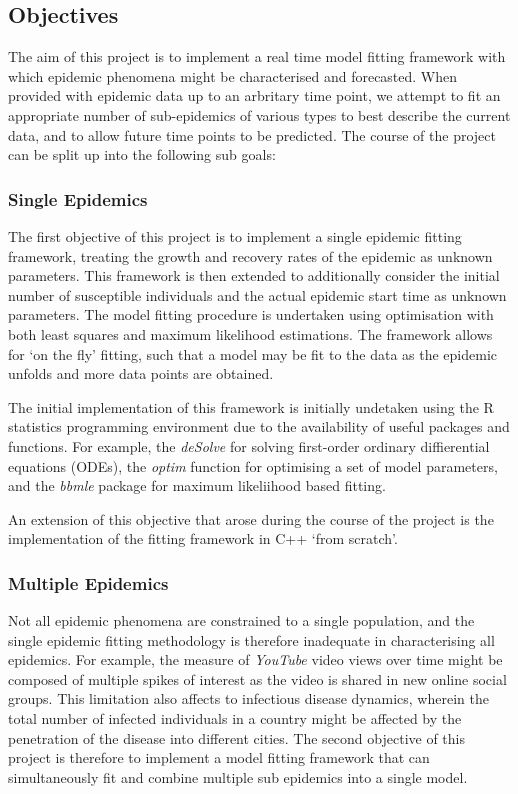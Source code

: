 \documentclass[11pt, a4paper, oneside,titlepage]{article}
\begin{document}
\subsection{Objectives}
The aim of this project is to implement a real time model fitting
framework with which epidemic phenomena might be characterised and
forecasted. When provided with epidemic data up to an arbritary time point,
we attempt to fit an appropriate number of sub-epidemics of various
types to best describe the current data, and to allow future time
points to be predicted. The course of the project can be split up into
the following sub goals:

\subsubsection{Single Epidemics}
The first objective of this project is to implement a single epidemic
fitting framework, treating the growth and recovery rates of the
epidemic as unknown parameters. This framework is then extended to
additionally consider the initial number of susceptible individuals
and the actual epidemic start time as unknown parameters. The model
fitting procedure is undertaken using optimisation with both least
squares and maximum likelihood estimations. The framework allows for
`on the fly' fitting, such that a model may be fit to the data as the
epidemic unfolds and more data points are obtained.

The initial implementation of this framework is initially undetaken using the R
statistics programming environment due to the availability of useful
packages and functions. For example, the \emph{deSolve} for solving
first-order ordinary diffierential equations (ODEs), the \emph{optim}
function for optimising a set of model parameters, and the
\emph{bbmle} package for maximum likeliihood based fitting.

An extension of this objective that arose during the course of the
project is the implementation of the fitting framework in C++ `from
scratch'.

\subsubsection{Multiple Epidemics}
Not all epidemic phenomena are constrained to a single population, and
the single epidemic fitting methodology is therefore inadequate in
characterising all epidemics. For example, the measure of
\emph{YouTube} video views over time might be composed of multiple
spikes of interest as the video is shared in new online social
groups. This limitation also affects to infectious disease dynamics,
wherein the total number of infected individuals in a country might be
affected by the penetration of the disease into different cities. The
second objective of this project is therefore to implement a model
fitting framework that can simultaneously fit and combine multiple
sub epidemics into a single model. 
\end{document}
